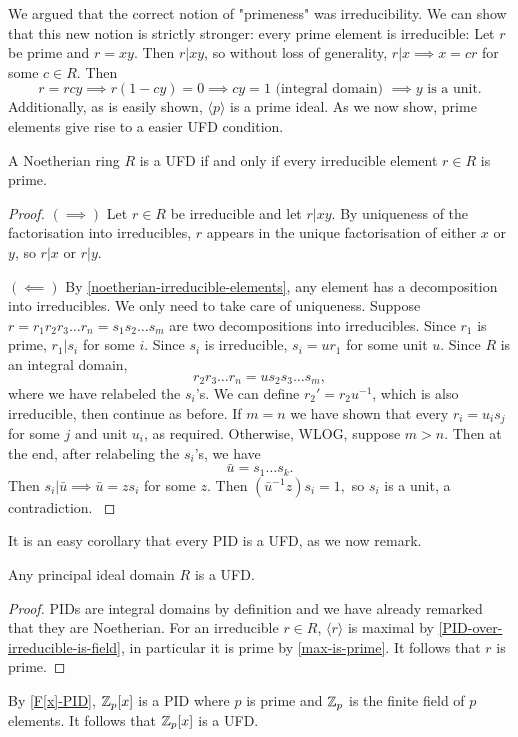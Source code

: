 We argued that the correct notion of "primeness" was irreducibility. We can show that this new notion is strictly stronger:  every prime element is irreducible: Let $r$ be prime and $r=xy$. Then $r|xy$, so without loss of generality, $r|x\implies x=cr$ for some $c\in R$. Then $$r=rcy\implies r(1-cy)=0\implies cy=1 \text{ (integral domain) }\implies y \text{ is a unit.}$$ Additionally, as is easily shown, $\langle p \rangle$ is a prime ideal. As we now show, prime elements give rise to a easier UFD condition.

\begin{proposition}\label{Noetherian-prime-UFD}
A Noetherian ring $R$ is a UFD if and only if every irreducible element $r\in R$ is prime.
\end{proposition}
\begin{proof}
$(\implies)$ Let $r\in R$ be irreducible and let $r|xy$. By uniqueness of the factorisation into irreducibles, $r$ appears in the unique factorisation of either $x$ or $y$, so $r|x$ or $r|y$.

$(\impliedby)$ By \cref{noetherian-irreducible-elements}, any element has a decomposition into irreducibles. We only need to take care of uniqueness. Suppose $r=r_1r_2r_3\dots r_n=s_1s_2\dots s_m$ are two decompositions into irreducibles. Since $r_1$ is prime, $r_1|s_i$ for some $i$. Since $s_i$ is irreducible, $s_i=ur_1$ for some unit $u$. Since $R$ is an integral domain, $$r_2r_3\dots r_n=us_2s_3\dots s_m,$$ where we have relabeled the $s_i$'s. We can define $r_2'=r_2u^{-1}$, which is also irreducible, then continue as before. If $m=n$ we have shown that every $r_i=u_is_j$ for some $j$ and unit $u_i$, as required. Otherwise, WLOG, suppose $m>n$. Then at the end, after relabeling the $s_i$'s, we have
$$\bar u= s_1\dots s_k.$$ Then $s_i|\bar{u}\implies \bar{u}=zs_i$ for some $z$. Then $(\bar{u}^{-1}z)s_i=1,$ so $s_i$ is a unit, a contradiction. \cite{Wright}
\end{proof}

It is an easy corollary that every PID is a UFD, as we now remark.

\begin{corollary}\label{PIDs-are-UFDs}
Any principal ideal domain $R$ is a UFD.
\end{corollary}
\begin{proof}
PIDs are integral domains by definition and we have already remarked that they are Noetherian. For an irreducible $r\in R$, $\langle r \rangle$ is maximal by \cref{PID-over-irreducible-is-field}, in particular it is prime by \cref{max-is-prime}. It follows that $r$ is prime.
\end{proof}

\begin{example}\label{Z_p[x]-is-UFD}
By \cref{F[x]-PID}, $\mathbb{Z}_p[x]$ is a PID where $p$ is prime and $\mathbb{Z}_p$ is the finite field of $p$ elements. It follows that $\mathbb{Z}_p[x]$ is a UFD.
\end{example}
